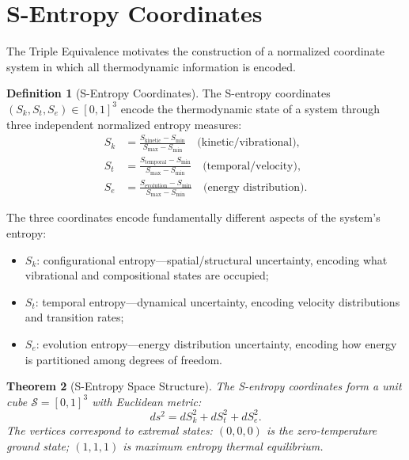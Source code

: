 \documentclass[twocolumn,10pt]{article}
\newtheorem{theorem}{Theorem}[section]
\theoremstyle{definition}
\newtheorem{definition}[theorem]{Definition}
\newcommand{\Sk}{S_k}
\newcommand{\St}{S_t}
\newcommand{\Se}{S_e}
\begin{document}
\section{S-Entropy Coordinates}\label{sec:sentropy}

The Triple Equivalence motivates the construction of a normalized coordinate system in which all thermodynamic information is encoded.

\begin{definition}[S-Entropy Coordinates]\label{def:sentropy}
The S-entropy coordinates $(\Sk, \St, \Se) \in [0,1]^3$ encode the thermodynamic state of a system through three independent normalized entropy measures:
\begin{align}
    \Sk &= \frac{S_{\mathrm{kinetic}} - S_{\min}}{S_{\max} - S_{\min}} \quad \text{(kinetic/vibrational)}, \label{eq:Sk} \\
    \St &= \frac{S_{\mathrm{temporal}} - S_{\min}}{S_{\max} - S_{\min}} \quad \text{(temporal/velocity)}, \label{eq:St} \\
    \Se &= \frac{S_{\mathrm{evolution}} - S_{\min}}{S_{\max} - S_{\min}} \quad \text{(energy distribution)}. \label{eq:Se}
\end{align}
\end{definition}

The three coordinates encode fundamentally different aspects of the system's entropy:
\begin{itemize}[nosep]
    \item $\Sk$: configurational entropy---spatial/structural uncertainty, encoding what vibrational and compositional states are occupied;
    \item $\St$: temporal entropy---dynamical uncertainty, encoding velocity distributions and transition rates;
    \item $\Se$: evolution entropy---energy distribution uncertainty, encoding how energy is partitioned among degrees of freedom.
\end{itemize}

\begin{theorem}[S-Entropy Space Structure]\label{thm:sentropy_space}
The S-entropy coordinates form a unit cube $\mathcal{S} = [0,1]^3$ with Euclidean metric:
\begin{equation}\label{eq:sentropy_metric}
    ds^2 = d\Sk^2 + d\St^2 + d\Se^2.
\end{equation}
The vertices correspond to extremal states: $(0,0,0)$ is the zero-temperature ground state; $(1,1,1)$ is maximum entropy thermal equilibrium.
\end{theorem}
\end{document}
